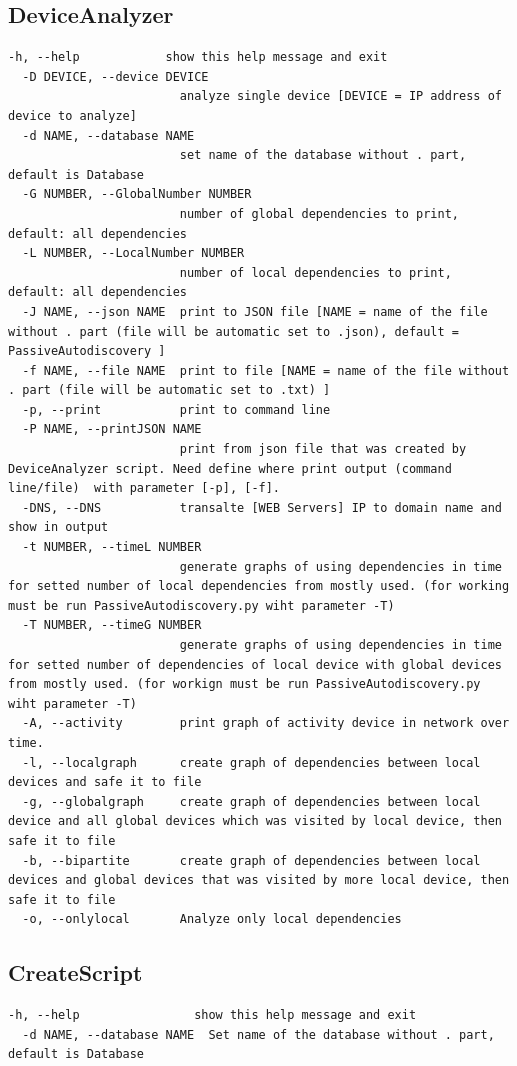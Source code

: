 \documentclass[thesis=B,czech,hidelinks]{FITthesis}[2019/03/21]
\begin{document}
\subsection{DeviceAnalyzer}
\begin{lstlisting}[style=example]
  -h, --help            show this help message and exit
  -D DEVICE, --device DEVICE
                        analyze single device [DEVICE = IP address of device to analyze]
  -d NAME, --database NAME
                        set name of the database without . part, default is Database
  -G NUMBER, --GlobalNumber NUMBER
                        number of global dependencies to print, default: all dependencies
  -L NUMBER, --LocalNumber NUMBER
                        number of local dependencies to print, default: all dependencies
  -J NAME, --json NAME  print to JSON file [NAME = name of the file without . part (file will be automatic set to .json), default = PassiveAutodiscovery ]
  -f NAME, --file NAME  print to file [NAME = name of the file without . part (file will be automatic set to .txt) ]
  -p, --print           print to command line
  -P NAME, --printJSON NAME
                        print from json file that was created by DeviceAnalyzer script. Need define where print output (command line/file)  with parameter [-p], [-f].
  -DNS, --DNS           transalte [WEB Servers] IP to domain name and show in output
  -t NUMBER, --timeL NUMBER
                        generate graphs of using dependencies in time for setted number of local dependencies from mostly used. (for working must be run PassiveAutodiscovery.py wiht parameter -T)
  -T NUMBER, --timeG NUMBER
                        generate graphs of using dependencies in time for setted number of dependencies of local device with global devices from mostly used. (for workign must be run PassiveAutodiscovery.py wiht parameter -T)
  -A, --activity        print graph of activity device in network over time.
  -l, --localgraph      create graph of dependencies between local devices and safe it to file
  -g, --globalgraph     create graph of dependencies between local device and all global devices which was visited by local device, then safe it to file
  -b, --bipartite       create graph of dependencies between local devices and global devices that was visited by more local device, then safe it to file
  -o, --onlylocal       Analyze only local dependencies
\end{lstlisting}
\subsection{CreateScript}
\begin{lstlisting}[style=example]
  -h, --help                show this help message and exit
  -d NAME, --database NAME  Set name of the database without . part,  default is Database
\end{lstlisting}
\end{document}
